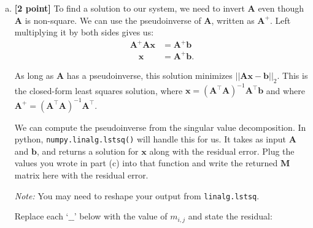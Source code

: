 \begin{enumerate}[(a)]
\pagebreak
\item \textbf{[2 point]} To find a solution to our system, we need to invert $\bm{A}$ even though $\bm{A}$ is non-square. We can use the pseudoinverse of $\bm{A}$, written as $\bm{A}^+$. Left multiplying it by both sides gives us:
\begin{align*}
 \bm{A}^+ \bm{A}\bm{x} &= \bm{A}^+ \bm{b}\\
 \quad \bm{x} &= \bm{A}^+ \bm{b}.
\end{align*}

As long as $\bm{A}$ has a pseudoinverse, this solution minimizes $||\bm{A}\bm{x} - \bm{b}||_2$. This is the closed-form least squares solution, where $\bm{x} = (\bm{A}^\top \bm{A})^{-1}\bm{A}^\top\bm{b}$ and where $\bm{A}^+ = (\bm{A}^\top \bm{A})^{-1}\bm{A}^\top$.

We can compute the pseudoinverse from the singular value decomposition. In python, \texttt{numpy.linalg.lstsq()} will handle this for us. It takes as input $\bm{A}$ and $\bm{b}$, and returns a solution for $\bm{x}$ along with the residual error. Plug the values you wrote in part (c) into that function and write the returned $\bm{M}$ matrix here with the residual error.

\textit{Note:} You may need to reshape your output from \texttt{linalg.lstsq}.

\begin{tcolorbox}[colback=orange!5!white,colframe=orange!75!black]
Replace each `$\_\_$' below with the value of $m_{i, j}$ and state the residual:
\end{tcolorbox}



\end{enumerate}
